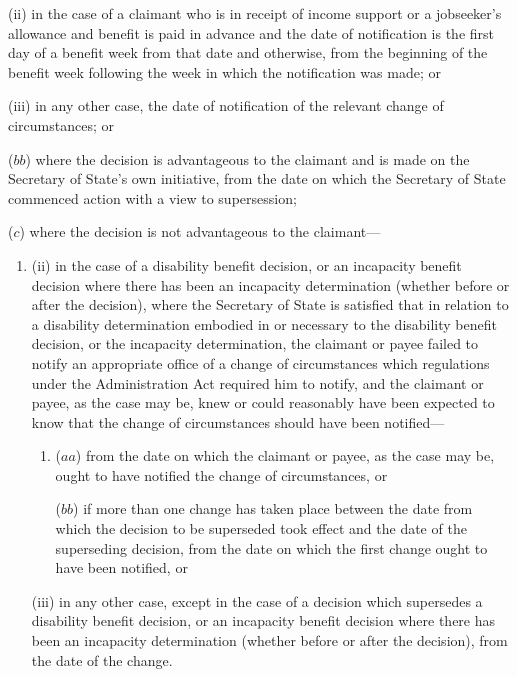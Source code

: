 \documentclass[12pt,a4paper]{article}
\begin{document}
\begin{enumerate}
\begin{enumerate}
(ii) in the case of a claimant who is in receipt of income support or a jobseeker’s allowance and benefit is paid in advance and the date of notification is the first day of a benefit week from that date and otherwise, from the beginning of the benefit week following the week in which the notification was made; or

(iii) in any other case, the date of notification of the relevant change of circumstances; or
\end{enumerate}

($bb$) where the decision is advantageous to the claimant and is made on the Secretary of State’s own initiative, from the date on which the Secretary of State commenced action with a view to supersession;

($c$) where the decision is not advantageous to the claimant—
\begin{enumerate}\item[]


(ii) in the case of a disability benefit decision, or an incapacity benefit decision where there has been an incapacity determination (whether before or after the decision), where the Secretary of State is satisfied that in relation to a disability determination embodied in or necessary to the disability benefit decision, or the incapacity determination, the claimant or payee failed to notify an appropriate office of a change of circumstances which regulations under the Administration Act required him to notify, and the claimant or payee, as the case may be, knew or could reasonably have been expected to know that the change of circumstances should have been notified---
\begin{enumerate}\item[]
($aa$) from the date on which the claimant or payee, as the case may be, ought to have notified the change of circumstances, or

($bb$) if more than one change has taken place between the date from which the decision to be superseded took effect and the date of the superseding decision, from the date on which the first change ought to have been notified, or
\end{enumerate}

(iii) in any other case, except in the case of a decision which supersedes a disability benefit decision, or an incapacity benefit decision where there has been an incapacity determination (whether before or after the decision), from the date of the change.
\end{enumerate}
\end{enumerate}
\end{document}

